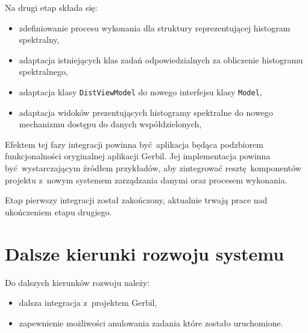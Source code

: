Na drugi etap składa się:
\begin{itemize}
		\item zdefiniowanie procesu wykonania dla struktury reprezentującej histogram spektralny,
		\item adaptacja istniejących klas zadań odpowiedzialnych za obliczenie histogramu spektralnego,
		\item adaptacja klasy \lstinline$DistViewModel$ do nowego interfejsu klasy \lstinline$Model$,
		\item adaptacja widoków prezentujących histogramy spektralne do nowego mechanizmu dostępu do danych współdzielonych,	
\end{itemize}

Efektem tej fazy integracji powinna być aplikacja będąca podzbiorem funkcjonalności oryginalnej aplikacji Gerbil. Jej implementacja powinna być wystarczającym źródłem przykładów, aby zintegrować resztę komponentów projektu z~nowym systemem zarządzania danymi oraz procesem wykonania.

Etap pierwszy integracji został zakończony, aktualnie trwają prace nad ukończeniem etapu drugiego.

\section{Dalsze kierunki rozwoju systemu}
Do dalszych kierunków rozwoju należy:
\begin{itemize}
	\item dalsza integracja z~projektem Gerbil,
	\item zapewnienie możliwości anulowania zadania które zostało uruchomione.
\end{itemize}
